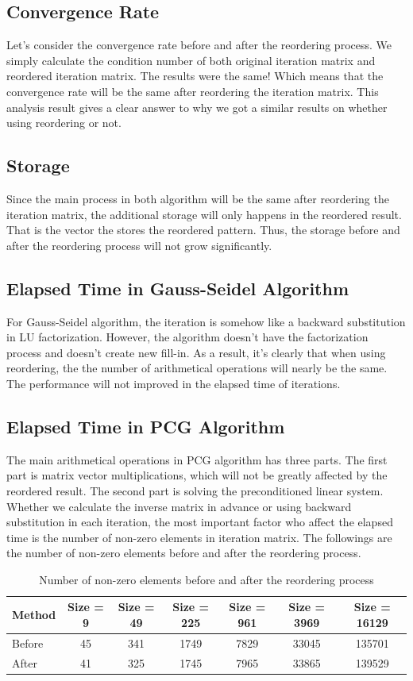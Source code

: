 \documentclass{article}
\begin{document}
\subsection{Convergence Rate}
Let's consider the convergence rate before and after the reordering process. We simply calculate the condition number of both original iteration matrix and reordered iteration matrix. The results were the same! Which means that the convergence rate will be the same after reordering the iteration matrix. This analysis result gives a clear answer to why we got a similar results on whether using reordering or not.

\subsection{Storage}
Since the main process in both algorithm will be the same after reordering the iteration matrix, the additional storage will only happens in the reordered result. That is the vector the stores the reordered pattern. Thus, the storage before and after the reordering process will not grow significantly.


\subsection{Elapsed Time in Gauss-Seidel Algorithm}
For Gauss-Seidel algorithm, the iteration is somehow like a backward substitution in LU factorization. However, the algorithm doesn't have the factorization process and doesn't create new fill-in. As a result, it's clearly that when using reordering, the the number of arithmetical operations will nearly be the same. The performance will not improved in the elapsed time of iterations. 


\subsection{Elapsed Time in PCG Algorithm}
The main arithmetical operations in PCG algorithm has three parts. The first part is matrix vector multiplications, which will not be greatly affected by the reordered result. The second part is solving the preconditioned linear system. Whether we calculate the inverse matrix in advance or using backward substitution in each iteration, the most important factor who affect the elapsed time is the number of non-zero elements in iteration matrix. The followings are the number of non-zero elements before and after the reordering process.

\begin{table}[h]
\begin{center}
\begin{tabular}{lcccccc}
\hline
Method & Size = 9 & Size = 49 & Size = 225 & Size = 961 & Size = 3969 & Size = 16129\\
\hline
Before & 45 & 341 & 1749 & 7829 & 33045 & 135701\\
After & 41 & 325 & 1745 & 7965 & 33865 & 139529\\
\hline
\end{tabular}
\caption{Number of non-zero elements before and after the reordering process}
\end{center}
\end{table}
\end{document}
